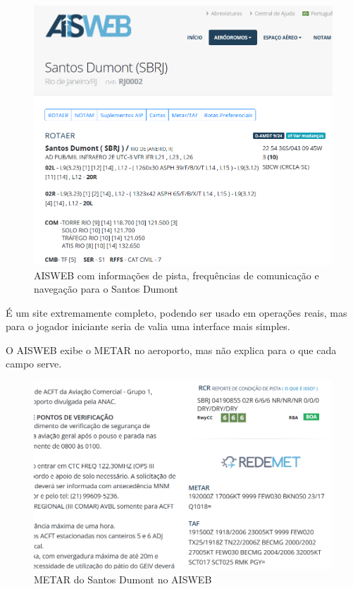 \begin{figure}[ht]
    \begin{center}
    \includegraphics[width=400pt]{img/aisweb.png}
    \caption{AISWEB com informações de pista, frequências de comunicação e navegação para o Santos Dumont}
    \label{fig:aisweb}
    \end{center}
\end{figure}

É um site extremamente completo, podendo
ser usado em operações reais, mas para o jogador iniciante seria 
de valia uma interface mais simples.

O AISWEB exibe o METAR no aeroporto, mas não explica para o que cada campo serve.

\begin{figure}[ht]
    \begin{center}
    \includegraphics[width=400pt]{img/metar-aisweb.png}
    \caption{METAR do Santos Dumont no AISWEB}
    \label{fig:aisweb}
    \end{center}
\end{figure}


